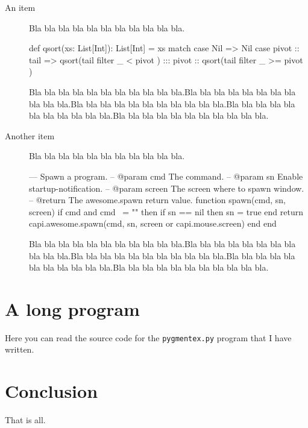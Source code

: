 \documentclass[12pt]{article}
\def\a{Bla bla bla bla bla bla bla bla bla bla bla.}
\def\b{\a\a\a\a\a}
\begin{document}
\begin{description}
  \item[An item] \a
  \begin{pygmented}[lang=scala,backgroundcolor=yellow,
    ]
def qsort(xs: List[Int]): List[Int] =
  xs match {
    case Nil =>
      Nil
    case pivot :: tail =>
      qsort(tail filter { _ < pivot }) :::
        pivot :: qsort(tail filter { _ >= pivot })
  }
  \end{pygmented}
  \b
  
  \item[Another item] \a
  \begin{pygmented}[lang=lua,backgroundcolor=yellow]
--- Spawn a program.
-- @param cmd The command.
-- @param sn Enable startup-notification.
-- @param screen The screen where to spawn window.
-- @return The awesome.spawn return value.
function spawn(cmd, sn, screen)
    if cmd and cmd ~= "" then
        if sn == nil then sn = true end
        return capi.awesome.spawn(cmd, sn, screen or capi.mouse.screen)
    end
end
  \end{pygmented}
  \b
\end{description}

\section{A long program}

Here you can read the source code for the \texttt{pygmentex.py} program
that I have written.


\section{Conclusion}

That is all.
\end{document}
